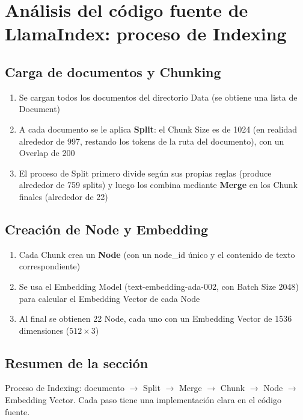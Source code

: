 \section{Análisis del código fuente de LlamaIndex: proceso de Indexing}

\subsection{Carga de documentos y Chunking}

\begin{enumerate}
    \item Se cargan todos los documentos del directorio Data (se obtiene una lista de Document)
    \item A cada documento se le aplica \textbf{Split}: el Chunk Size es de 1024 (en realidad alrededor de 997, restando los tokens de la ruta del documento), con un Overlap de 200
    \item El proceso de Split primero divide según sus propias reglas (produce alrededor de 759 splits) y luego los combina mediante \textbf{Merge} en los Chunk finales (alrededor de 22)
\end{enumerate}

\subsection{Creación de Node y Embedding}

\begin{enumerate}
    \item Cada Chunk crea un \textbf{Node} (con un node\_id único y el contenido de texto correspondiente)
    \item Se usa el Embedding Model (text-embedding-ada-002, con Batch Size 2048) para calcular el Embedding Vector de cada Node
    \item Al final se obtienen 22 Node, cada uno con un Embedding Vector de 1536 dimensiones ($512 \times 3$)
\end{enumerate}

\subsection{Resumen de la sección}

Proceso de Indexing: documento $\rightarrow$ Split $\rightarrow$ Merge $\rightarrow$ Chunk $\rightarrow$ Node $\rightarrow$ Embedding Vector. Cada paso tiene una implementación clara en el código fuente.
